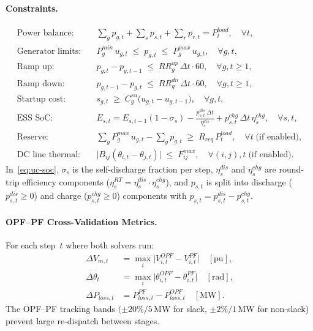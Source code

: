 \paragraph{Constraints.}
\begin{align}
  \text{Power balance:} \quad &
    \sum_g p_{g,t} + \sum_s p_{s,t} + \sum_r p_{r,t} = P_t^{load},
    \quad \forall t, \label{eq:uc-pb}\\
  \text{Generator limits:} \quad &
    P_g^{min}\,u_{g,t} \;\leq\; p_{g,t} \;\leq\; P_g^{max}\,u_{g,t},
    \quad \forall g,t, \label{eq:uc-gen}\\
  \text{Ramp up:} \quad &
    p_{g,t} - p_{g,t-1} \;\leq\; RR_g^{up}\,\Delta t\cdot 60,
    \quad \forall g,t\geq 1, \label{eq:uc-ramp-up}\\
  \text{Ramp down:} \quad &
    p_{g,t-1} - p_{g,t} \;\leq\; RR_g^{dn}\,\Delta t\cdot 60,
    \quad \forall g,t\geq 1, \label{eq:uc-ramp-dn}\\
  \text{Startup cost:} \quad &
    s_{g,t} \;\geq\; C_g^{su}\bigl(u_{g,t} - u_{g,t-1}\bigr),
    \quad \forall g,t, \label{eq:uc-su}\\
  \text{ESS SoC:} \quad &
    E_{s,t} = E_{s,t-1}(1{-}\sigma_s)
      - \frac{p_{s,t}^{dis}\,\Delta t}{\eta_s^{dis}}
      + p_{s,t}^{chg}\,\Delta t\,\eta_s^{chg},
    \quad \forall s,t, \label{eq:uc-soc}\\
  \text{Reserve:} \quad &
    \sum_g P_g^{max}\,u_{g,t} - \sum_g p_{g,t}
    \;\geq\; R_{req}\,P_t^{load},
    \quad \forall t \;\text{(if enabled)}, \label{eq:uc-reserve}\\
  \text{DC line thermal:} \quad &
    \bigl|B_{ij}(\theta_{i,t}-\theta_{j,t})\bigr|
    \;\leq\; F_{ij}^{max}, \quad \forall (i,j),t \;\text{(if enabled)}.
    \label{eq:uc-thermal}
\end{align}
In~\eqref{eq:uc-soc}, $\sigma_s$ is the self-discharge fraction per step,
$\eta_s^{dis}$ and $\eta_s^{chg}$ are round-trip efficiency components
($\eta_s^{RT} = \eta_s^{dis}\cdot\eta_s^{chg}$), and $p_{s,t}$ is split into
discharge ($p_{s,t}^{dis} \geq 0$) and charge ($p_{s,t}^{chg} \geq 0$)
components with $p_{s,t} = p_{s,t}^{dis} - p_{s,t}^{chg}$.

\paragraph{OPF--PF Cross-Validation Metrics.}
For each step~$t$ where both solvers run:
\begin{align}
  \Delta V_{m,t} &= \max_i\bigl|V_{i,t}^{OPF} - V_{i,t}^{PF}\bigr|
    \quad [\text{pu}], \\
  \Delta\theta_t &= \max_i\bigl|\theta_{i,t}^{OPF} - \theta_{i,t}^{PF}\bigr|
    \quad [\text{rad}], \\
  \Delta P_{loss,t} &= P_{loss,t}^{PF} - P_{loss,t}^{OPF}
    \quad [\text{MW}].
\end{align}
The OPF--PF tracking bands $(\pm 20\%/5\,\text{MW}$ for slack,
$\pm 2\%/1\,\text{MW}$ for non-slack) prevent large re-dispatch between
stages.

